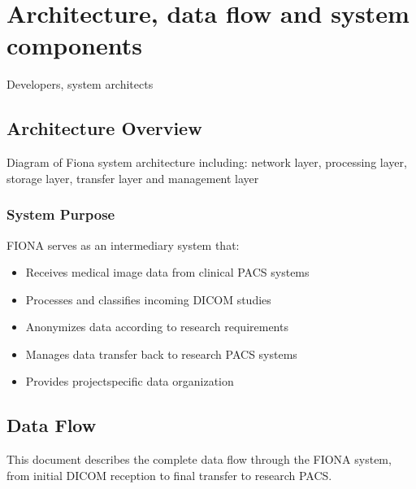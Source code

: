 \documentclass[letterpaper,10pt,english]{sphinxmanual}
\begin{document}
\sphinxstepscope


\chapter{Architecture, data flow and system components}
\label{\detokenize{Architecture/index:architecture-data-flow-and-system-components}}\label{\detokenize{Architecture/index::doc}}
\sphinxAtStartPar
{} Developers, system architects

\sphinxstepscope


\section{Architecture Overview}
\label{\detokenize{Architecture/overview:architecture-overview}}\label{\detokenize{Architecture/overview::doc}}
\sphinxAtStartPar
Diagram of Fiona system architecture including: network layer, processing layer, storage layer, transfer layer and management layer



\subsection{System Purpose}
\label{\detokenize{Architecture/overview:system-purpose}}
\sphinxAtStartPar
FIONA serves as an intermediary system that:
\begin{itemize}
\item {} 
\sphinxAtStartPar
Receives medical image data from clinical PACS systems

\item {} 
\sphinxAtStartPar
Processes and classifies incoming DICOM studies

\item {} 
\sphinxAtStartPar
Anonymizes data according to research requirements

\item {} 
\sphinxAtStartPar
Manages data transfer back to research PACS systems

\item {} 
\sphinxAtStartPar
Provides project\sphinxhyphen{}specific data organization

\end{itemize}

\sphinxstepscope


\section{Data Flow}
\label{\detokenize{Architecture/data-flow:data-flow}}\label{\detokenize{Architecture/data-flow::doc}}
\sphinxAtStartPar
This document describes the complete data flow through the FIONA system, from initial DICOM reception to final transfer to research PACS.
\end{document}
